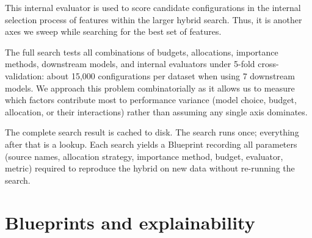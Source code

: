 {This internal evaluator is used to score candidate configurations in the internal selection process of features within the larger hybrid search. Thus, it is another axes we sweep while searching for the best set of features. 



The full search tests all combinations of budgets, allocations, importance methods, downstream models, and internal evaluators under 5-fold cross-validation: about 15,000 configurations per dataset when using 7 downstream models. We approach this problem combinatorially as it allows us to measure which factors contribute most to performance variance (model choice, budget, allocation, or their interactions) rather than assuming any single axis dominates.


The complete search result is cached to disk. The search runs once; everything after that is a lookup. Each search yields a Blueprint recording all parameters (source names, allocation strategy, importance method, budget, evaluator, metric) required to reproduce the hybrid on new data without re-running the search.


\section{Blueprints and explainability}


}
